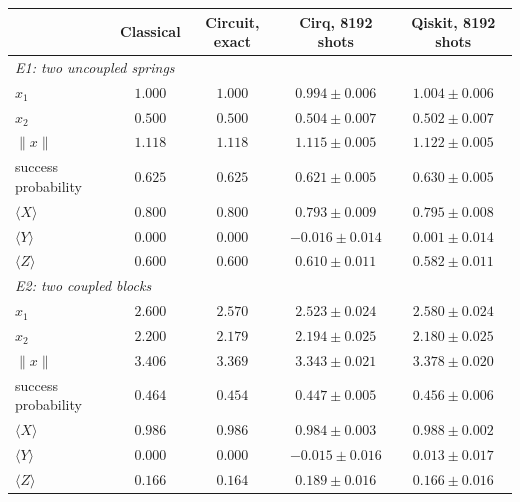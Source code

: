 \begin{tabular}{lcccc}
\toprule
 & Classical & Circuit, exact & Cirq, 8192 shots & Qiskit, 8192 shots \\
\midrule
\multicolumn{5}{l}{\textit{E1: two uncoupled springs}} \\
$x_1$ & $1.000$ & $1.000$ & $0.994 \pm 0.006$ & $1.004 \pm 0.006$ \\
$x_2$ & $0.500$ & $0.500$ & $0.504 \pm 0.007$ & $0.502 \pm 0.007$ \\
$\lVert x\rVert$ & $1.118$ & $1.118$ & $1.115 \pm 0.005$ & $1.122 \pm 0.005$ \\
success probability & $0.625$ & $0.625$ & $0.621 \pm 0.005$ & $0.630 \pm 0.005$ \\
$\langle X\rangle$ & $0.800$ & $0.800$ & $0.793 \pm 0.009$ & $0.795 \pm 0.008$ \\
$\langle Y\rangle$ & $0.000$ & $0.000$ & $-0.016 \pm 0.014$ & $0.001 \pm 0.014$ \\
$\langle Z\rangle$ & $0.600$ & $0.600$ & $0.610 \pm 0.011$ & $0.582 \pm 0.011$ \\
\midrule
\multicolumn{5}{l}{\textit{E2: two coupled blocks}} \\
$x_1$ & $2.600$ & $2.570$ & $2.523 \pm 0.024$ & $2.580 \pm 0.024$ \\
$x_2$ & $2.200$ & $2.179$ & $2.194 \pm 0.025$ & $2.180 \pm 0.025$ \\
$\lVert x\rVert$ & $3.406$ & $3.369$ & $3.343 \pm 0.021$ & $3.378 \pm 0.020$ \\
success probability & $0.464$ & $0.454$ & $0.447 \pm 0.005$ & $0.456 \pm 0.006$ \\
$\langle X\rangle$ & $0.986$ & $0.986$ & $0.984 \pm 0.003$ & $0.988 \pm 0.002$ \\
$\langle Y\rangle$ & $0.000$ & $0.000$ & $-0.015 \pm 0.016$ & $0.013 \pm 0.017$ \\
$\langle Z\rangle$ & $0.166$ & $0.164$ & $0.189 \pm 0.016$ & $0.166 \pm 0.016$ \\
\bottomrule
\end{tabular}
